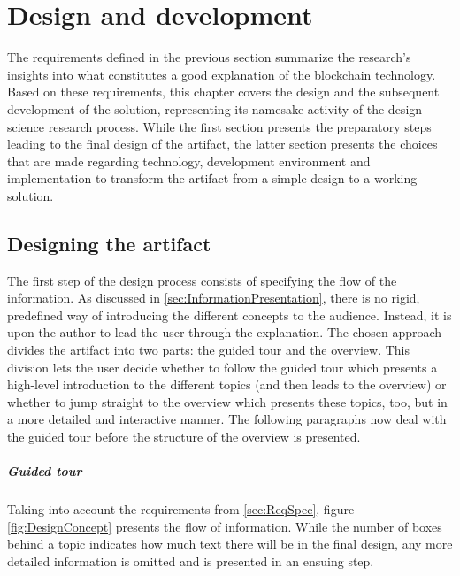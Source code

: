 \chapter{Design and development} \label{chap:designanddev}
The requirements defined in the previous section summarize the research's insights into what constitutes a good explanation of the blockchain technology. Based on these requirements, this chapter covers the design and the subsequent development of the solution, representing its namesake activity of the design science research process. While the first section presents the preparatory steps leading to the final design of the artifact, the latter section presents the choices that are made regarding technology, development environment and implementation to transform the artifact from a simple design to a working solution.

\section{Designing the artifact} \label{sec:ArtifactDesign}
The first step of the design process consists of specifying the flow of the information. As discussed in \ref{sec:InformationPresentation}, there is no rigid, predefined way of introducing the different concepts to the audience. Instead, it is upon the author to lead the user through the explanation. The chosen approach divides the artifact into two parts: the guided tour and the overview. This division lets the user decide whether to follow the guided tour which presents a high-level introduction to the different topics (and then leads to the overview) or whether to jump straight to the overview which presents these topics, too, but in a more detailed and interactive manner. The following paragraphs now deal with the guided tour before the structure of the overview is presented.

\paragraph{Guided tour} Taking into account the requirements from \ref{sec:ReqSpec}, figure \ref{fig:DesignConcept} presents the flow of information. %
While the number of boxes behind a topic indicates how much text there will be in the final design, any more detailed information is omitted and is presented in an ensuing step. 

